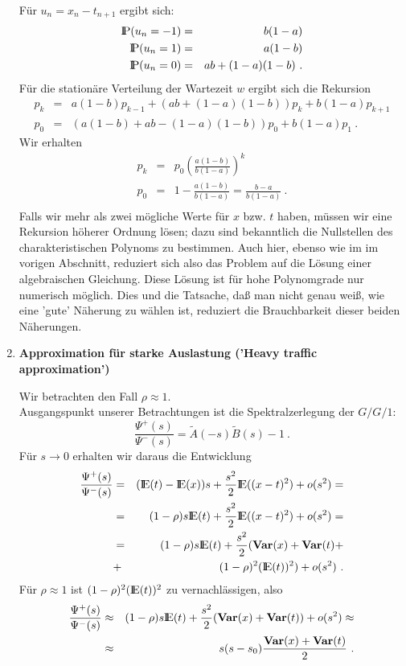 \begin{enumerate}
Für $u_{n}=x_{n}-t_{n+1}$ ergibt sich:
\begin{eqnarray*}
   {\rm I\kern-0.2em P}(u_{n}=-1)&=&b(1-a) \\
   {\rm I\kern-0.2em P}(u_{n}=1)&=&a(1-b) \\
   {\rm I\kern-0.2em P}(u_{n}=0)&=&ab+(1-a)(1-b) ~.
\end{eqnarray*}
Für die stationäre Verteilung der Wartezeit $w$ ergibt sich die Rekursion
\begin{eqnarray*}
  p_{k}&=&a(1-b)p_{k-1}+(ab+(1-a)(1-b))p_{k}+b(1-a)p_{k+1} \\
  p_{0}&=&(a(1-b)+ab-(1-a)(1-b))p_{0}+b(1-a)p_{1} ~.
\end{eqnarray*}
Wir erhalten
\begin{eqnarray*}
  p_{k}&=&p_{0}\left( \frac{a(1-b)}{b(1-a)}\right)^{k} \\
  p_{0}&=&1-\frac{a(1-b)}{b(1-a)}=\frac{b-a}{b(1-a)} ~.\\
\end{eqnarray*}
Falls wir mehr als zwei mögliche Werte für $x$ bzw. $t$ haben, müssen wir eine Rekursion höherer Ordnung lösen; dazu sind bekanntlich die Nullstellen des
charakteristischen Polynoms zu bestimmen. Auch hier, ebenso wie im im vorigen Abschnitt, reduziert sich also das Problem auf die Lösung einer algebraischen
Gleichung. Diese Lösung ist für hohe Polynomgrade nur numerisch möglich. Dies und die Tatsache, daß man nicht genau weiß, wie eine 'gute' Näherung zu
wählen
ist, reduziert die Brauchbarkeit dieser beiden Näherungen.

\item {\bf Approximation für starke Auslastung ('Heavy traffic approximation')}

Wir betrachten den Fall $\rho \approx 1$. \\
Ausgangspunkt unserer Betrachtungen ist die Spektralzerlegung der $G/G/1$:
\[\frac{\Psi^{+}(s)}{\Psi^{-}(s)}=\tilde A (-s)\tilde B (s)-1 ~.\]
Für $s \rightarrow 0$ erhalten wir daraus die Entwicklung
\begin{eqnarray*}
  \frac{\Psi^{+}(s)}{\Psi^{-}(s)}&=&({\rm I\kern-0.2em E}(t)-{\rm I\kern-0.2em E}(x))s+\frac{s^{2}}{2}{\rm I\kern-0.2em E}((x-t)^{2})+o(s^{2})= \\
                                 &=&(1-\rho)s{\rm I\kern-0.2em E}(t)+\frac{s^{2}}{2}{\rm I\kern-0.2em E}((x-t)^{2})+o(s^{2})=  \\
                                 &=&(1-\rho)s{\rm I\kern-0.2em E}(t)+\frac{s^{2}}{2}({\bf Var}(x)+{\bf Var}(t)+ \\
                                 &+&(1-\rho)^{2}({\rm I\kern-0.2em E}(t))^{2}) + o(s^{2}) ~.
\end{eqnarray*}
Für $\rho \approx 1$ ist $(1-\rho)^{2}({\rm I\kern-0.2em E}(t))^{2}$ zu vernachlässigen, also
\begin{eqnarray*}
  \frac{\Psi^{+}(s)}{\Psi^{-}(s)}&\approx&(1-\rho)s{\rm I\kern-0.2em E}(t)+\frac{s^{2}}{2}({\bf Var}(x)+{\bf Var}(t))+o(s^{2}) \approx \\
  &\approx&s(s-s_{0}) \frac{{\bf Var}(x)+{\bf Var}(t)}{2} ~.
\end{eqnarray*}


\end{enumerate}
